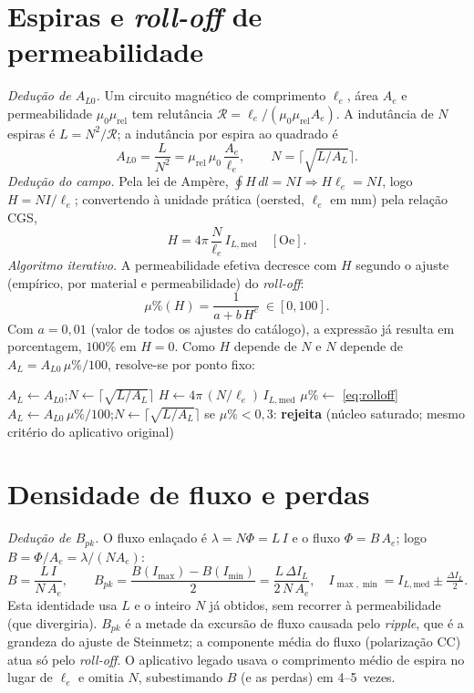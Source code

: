 \documentclass[
	a4paper, 12pt,
	chapter=TITLE, section=Title, subsection=Title,
	oneside, english, brazil, fleqn
]{abntex2}
\begin{document}
\section{Espiras e \emph{roll-off} de permeabilidade}
\textit{Dedução de $A_{L0}$.} Um circuito magnético de comprimento $\ell_e$, área
$A_e$ e permeabilidade $\mu_0\mu_{\mathrm{rel}}$ tem relutância
$\mathcal{R}=\ell_e/(\mu_0\mu_{\mathrm{rel}}A_e)$. A indutância de $N$ espiras é
$L=N^2/\mathcal{R}$; a indutância por espira ao quadrado é
\begin{equation}
	A_{L0}=\frac{L}{N^2}=\mu_{\mathrm{rel}}\,\mu_0\,\frac{A_e}{\ell_e},\qquad
	N=\bigl\lceil\sqrt{L/A_L}\bigr\rceil.
	\label{eq:al0}
\end{equation}
\textit{Dedução do campo.} Pela lei de Ampère, $\oint\!H\,dl=N I\Rightarrow H\ell_e=NI$,
logo $H=NI/\ell_e$; convertendo à unidade prática (oersted, $\ell_e$ em mm) pela
relação CGS,
\begin{equation}
	H=4\pi\,\frac{N}{\ell_e}\,I_{L,\mathrm{med}}\quad[\mathrm{Oe}].
	\label{eq:H}
\end{equation}
\textit{Algoritmo iterativo.} A permeabilidade efetiva decresce com $H$ segundo o
ajuste (empírico, por material e permeabilidade) do \emph{roll-off}:
\begin{equation}
	\mu\%(H)=\frac{1}{a+b\,H^{c}}\ \in[0,100].
	\label{eq:rolloff}
\end{equation}
Com $a=0{,}01$ (valor de todos os ajustes do catálogo), a expressão já resulta em
porcentagem, $100\%$ em $H=0$.
Como $H$ depende de $N$ e $N$ depende de $A_L=A_{L0}\,\mu\%/100$, resolve-se por
ponto fixo:
\begin{algorithmic}[1]
	\STATE $A_L\leftarrow A_{L0}$;\quad $N\leftarrow\lceil\sqrt{L/A_L}\rceil$
	\REPEAT
		\STATE $H\leftarrow 4\pi\,(N/\ell_e)\,I_{L,\mathrm{med}}$
		\STATE $\mu\%\leftarrow$ \eqref{eq:rolloff}
		\STATE $A_L\leftarrow A_{L0}\,\mu\%/100$;\quad $N\leftarrow\lceil\sqrt{L/A_L}\rceil$
	\STATE se $\mu\%<0{,}3$: \textbf{rejeita} (núcleo saturado; mesmo critério do aplicativo original)
\end{algorithmic}

\section{Densidade de fluxo e perdas}
\textit{Dedução de $B_{pk}$.} O fluxo enlaçado é $\lambda=N\Phi=L\,I$ e o fluxo
$\Phi=B\,A_e$; logo $B=\Phi/A_e=\lambda/(N A_e)$:
\begin{equation}
	B=\frac{L\,I}{N\,A_e},\qquad
	B_{pk}=\frac{B(I_{\max})-B(I_{\min})}{2}=\frac{L\,\Delta I_L}{2\,N\,A_e},
	\quad I_{\max,\min}=I_{L,\mathrm{med}}\pm\tfrac{\Delta I_L}{2}.
	\label{eq:bpk}
\end{equation}
Esta identidade usa $L$ e o inteiro $N$ já obtidos, sem recorrer à permeabilidade
(que divergiria). $B_{pk}$ é a metade da excursão de fluxo causada pelo
\emph{ripple}, que é a grandeza do ajuste de Steinmetz; a componente média do
fluxo (polarização CC) atua só pelo \emph{roll-off}. O aplicativo legado usava o
comprimento médio de espira no lugar de $\ell_e$ e omitia $N$, subestimando $B$
(e as perdas) em \numrange{4}{5}~vezes.
\end{document}
